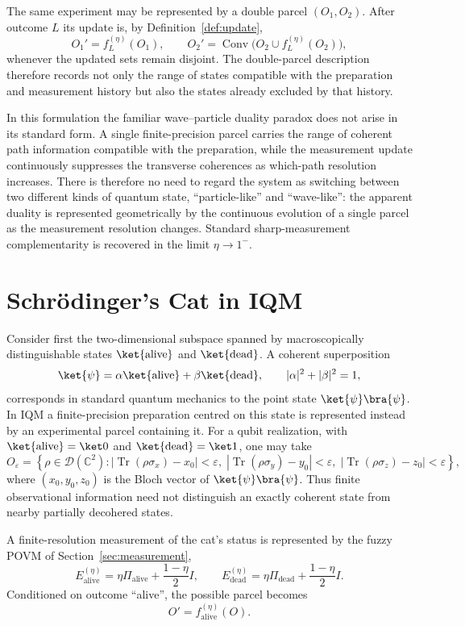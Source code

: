\documentclass[11pt, onecolumn]{article}
\begin{document}
The same experiment may be represented by a double parcel $(O_1,O_2)$.
After outcome $L$ its update is, by Definition~\ref{def:update},
\[
O_1'=f_L^{(\eta)}(O_1),
\qquad
O_2'
=
\operatorname{Conv}
\bigl(O_2\cup f_L^{(\eta)}(O_2)\bigr),
\]
whenever the updated sets remain disjoint. The double-parcel
description therefore records not only the range of states compatible with
the preparation and measurement history but also the states already excluded
by that history.

In this formulation the familiar wave--particle duality paradox does not
arise in its standard form. A single finite-precision parcel carries the
range of coherent path information compatible with the preparation, while
the measurement update continuously suppresses the transverse coherences
as which-path resolution increases. There is therefore no need to regard
the system as switching between two different kinds of quantum state,
``particle-like'' and ``wave-like'': the apparent duality is represented
geometrically by the continuous evolution of a single parcel as the
measurement resolution changes. Standard sharp-measurement complementarity
is recovered in the limit $\eta\to1^-$.
\section{Schr\"odinger's Cat in IQM}
\label{sec:cat}

Consider first the two-dimensional subspace spanned by macroscopically
distinguishable states $\ket{\text{alive}}$ and $\ket{\text{dead}}$.  A coherent
superposition
\[
\ket{\psi}
=
\alpha\ket{\text{alive}}+\beta\ket{\text{dead}},
\qquad
|\alpha|^2+|\beta|^2=1,
\]
corresponds in standard quantum mechanics to the point state
$\ket{\psi}\bra{\psi}$.  In IQM a finite-precision preparation centred on
this state is represented instead by an experimental parcel containing it.
For a qubit realization, with $\ket{\text{alive}}=\ket0$ and
$\ket{\text{dead}}=\ket1$, one may take
\[
O_\varepsilon
=
\left\{
\rho\in\mathcal D(\mathbb C^2):
|\operatorname{Tr}(\rho\sigma_x)-x_0|<\varepsilon,\;
|\operatorname{Tr}(\rho\sigma_y)-y_0|<\varepsilon,\;
|\operatorname{Tr}(\rho\sigma_z)-z_0|<\varepsilon
\right\},
\]
where $(x_0,y_0,z_0)$ is the Bloch vector of
$\ket{\psi}\bra{\psi}$.  Thus finite observational information need not
distinguish an exactly coherent state from nearby partially decohered
states.

A finite-resolution measurement of the cat's status is represented by the
fuzzy POVM of Section~\ref{sec:measurement},
\[
E_{\text{alive}}^{(\eta)}
=
\eta\Pi_{\text{alive}}+\frac{1-\eta}{2}I,
\qquad
E_{\text{dead}}^{(\eta)}
=
\eta\Pi_{\text{dead}}+\frac{1-\eta}{2}I.
\]
Conditioned on outcome ``alive'', the possible parcel becomes
\[
O'=f_{\text{alive}}^{(\eta)}(O).
\]
\end{document}
